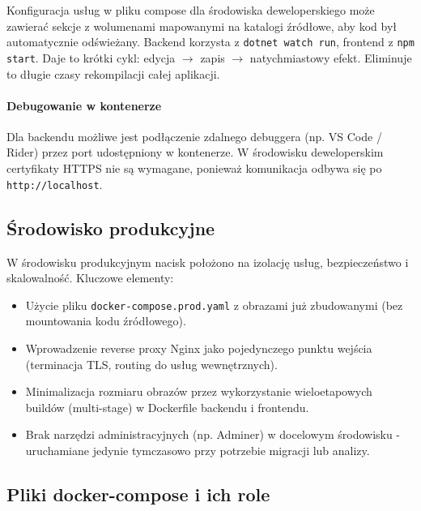 Konfiguracja usług w pliku compose dla środowiska deweloperskiego może zawierać sekcje z wolumenami mapowanymi na katalogi źródłowe, aby kod był automatycznie odświeżany. Backend korzysta z \texttt{dotnet watch run}, frontend z \texttt{npm start}. Daje to krótki cykl: edycja $\rightarrow$ zapis $\rightarrow$ natychmiastowy efekt. Eliminuje to długie czasy rekompilacji całej aplikacji.

\paragraph{Debugowanie w kontenerze} Dla backendu możliwe jest podłączenie zdalnego debuggera (np. VS Code / Rider) przez port udostępniony w kontenerze. W środowisku deweloperskim certyfikaty HTTPS nie są wymagane, ponieważ komunikacja odbywa się po \texttt{http://localhost}.

\subsection{Środowisko produkcyjne}

W środowisku produkcyjnym nacisk położono na izolację usług, bezpieczeństwo i skalowalność. Kluczowe elementy:
\begin{itemize}
    \item Użycie pliku \texttt{docker-compose.prod.yaml} z obrazami już zbudowanymi (bez mountowania kodu źródłowego).
    \item Wprowadzenie reverse proxy Nginx jako pojedynczego punktu wejścia (terminacja TLS, routing do usług wewnętrznych).
    \item Minimalizacja rozmiaru obrazów przez wykorzystanie wieloetapowych buildów (multi-stage) w Dockerfile backendu i frontendu.
    \item Brak narzędzi administracyjnych (np. Adminer) w docelowym środowisku - uruchamiane jedynie tymczasowo przy potrzebie migracji lub analizy.
\end{itemize}

\subsection{Pliki docker-compose i ich role}

